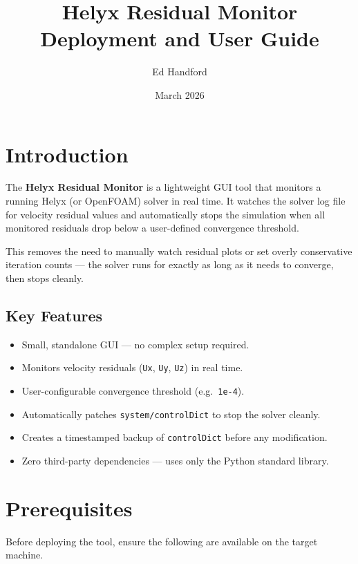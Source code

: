 \documentclass[12pt]{article}
\title{Helyx Residual Monitor \\ \large Deployment and User Guide}
\author{Ed Handford}
\date{March 2026}
\begin{document}
\maketitle

\tableofcontents
\newpage

\section{Introduction}

The \textbf{Helyx Residual Monitor} is a lightweight GUI tool that monitors a running Helyx (or OpenFOAM) solver in real time. It watches the solver log file for velocity residual values and automatically stops the simulation when all monitored residuals drop below a user-defined convergence threshold.

This removes the need to manually watch residual plots or set overly conservative iteration counts --- the solver runs for exactly as long as it needs to converge, then stops cleanly.

\subsection{Key Features}

\begin{itemize}[nosep]
    \item Small, standalone GUI --- no complex setup required.
    \item Monitors velocity residuals (\texttt{Ux}, \texttt{Uy}, \texttt{Uz}) in real time.
    \item User-configurable convergence threshold (e.g.\ \texttt{1e-4}).
    \item Automatically patches \texttt{system/controlDict} to stop the solver cleanly.
    \item Creates a timestamped backup of \texttt{controlDict} before any modification.
    \item Zero third-party dependencies --- uses only the Python standard library.
\end{itemize}

\section{Prerequisites}

Before deploying the tool, ensure the following are available on the target machine.
\end{document}

